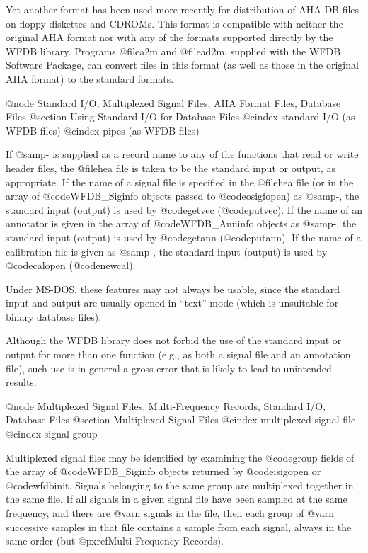 {{{{{{{{{{{{{{Yet another format has been used more recently for distribution of AHA DB files
on floppy diskettes and CDROMs.  This format is compatible with neither the
original AHA format nor with any of the formats supported directly by the WFDB
library.  Programs @file{a2m} and @file{ad2m}, supplied with the WFDB Software
Package, can convert files in this format (as well as those in the original AHA
format) to the standard formats.

@node Standard I/O, Multiplexed Signal Files, AHA Format Files, Database Files
@section Using Standard I/O for Database Files
@cindex standard I/O (as WFDB files)
@cindex pipes (as WFDB files)

If @samp{-} is supplied as a record name to any of the functions that
read or write header files, the @file{hea} file is taken to be
the standard input or output, as appropriate.  If the name of a signal
file is specified in the @file{hea} file (or in the array of
@code{WFDB_Siginfo} objects passed to @code{osigfopen}) as @samp{-}, the
standard input (output) is used by @code{getvec} (@code{putvec}).  If
the name of an annotator is given in the array of @code{WFDB_Anninfo} objects
as @samp{-}, the standard input (output) is used by @code{getann}
(@code{putann}).  If the name of a calibration file is given as
@samp{-}, the standard input (output) is used by @code{calopen}
(@code{newcal}).

Under MS-DOS, these features may not always be usable, since the
standard input and output are usually opened in ``text'' mode (which
is unsuitable for binary database files).

Although the WFDB library does not forbid the use of the standard
input or output for more than one function (e.g., as both a signal file
and an annotation file), such use is in general a gross error that is
likely to lead to unintended results.

@node     Multiplexed Signal Files, Multi-Frequency Records, Standard I/O, Database Files
@section Multiplexed Signal Files
@cindex multiplexed signal file
@cindex signal group

Multiplexed signal files may be identified by examining the @code{group}
fields of the array of @code{WFDB_Siginfo} objects returned by
@code{isigopen} or @code{wfdbinit}.  Signals belonging to the same group
are multiplexed together in the same file.  If all signals in a given signal
file have been sampled at the same frequency, and there are @var{n} signals
in the file, then each group of @var{n} successive samples in that file
contains a sample from each signal, always in the same order
(but @pxref{Multi-Frequency Records}).

}}}}}}}}}}}}}}
